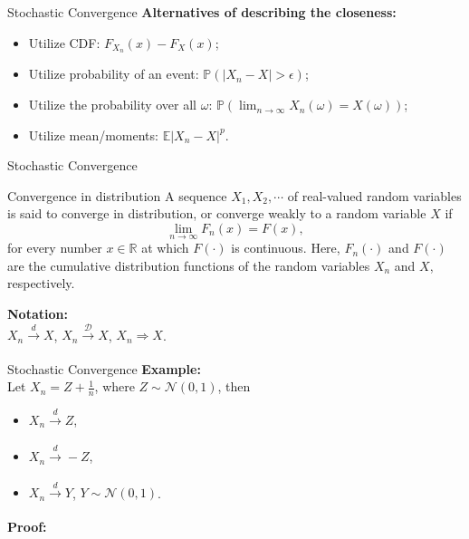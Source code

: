 \documentclass [aspectratio=169]{beamer}
\begin{document}
\begin{frame}{Stochastic Convergence}
    \textbf{Alternatives of describing the closeness:}
    \begin{itemize}
        \item Utilize CDF: $F_{X_n}(x) - F_X(x)$;
        \item Utilize probability of an event: $\mathbb{P}(|X_n - X| > \epsilon)$;
        \item Utilize the probability over all $\omega$: $\mathbb{P}(\lim _{n\to \infty }X_{n}(\omega )=X(\omega))$;
        \item Utilize mean/moments: $\mathbb{E}|X_n - X|^p$.
    \end{itemize}
\end{frame}



\begin{frame}{Stochastic Convergence}
    \begin{block}{Convergence in distribution}
    A sequence $X_1, X_2, \cdots$ of real-valued random variables is said to converge in distribution, or converge weakly to a random variable $X$ if
$$
{\displaystyle \lim _{n\to \infty }F_{n}(x)=F(x),}
$$
for every number $x \in \mathbb{R}$ at which $F(\cdot)$ is continuous. Here, $F_n(\cdot)$ and $F(\cdot)$ are the cumulative distribution functions of the random variables $X_n$ and $X$, respectively.
\end{block}
\vspace{0.1in}
\textbf{Notation:}\\
$X_n \xrightarrow[]{d} X$, \quad $X_n \xrightarrow[]{\mathcal{D}} X$, \quad $X_n \Rightarrow X$. \\
\vspace{0.1in}
\end{frame}




\begin{frame}{Stochastic Convergence}
    \textbf{Example:}\\
    Let $X_n = Z + \frac{1}{n}$, where $Z \sim \mathcal{N}(0,1)$, then 
    \begin{itemize}
        \item $X_n \xrightarrow[]{d} Z$,
        \item $X_n \xrightarrow[]{d} -Z$,
        \item $X_n \xrightarrow[]{d} Y$, $Y \sim \mathcal{N}(0,1)$.
    \end{itemize}
    \vspace{0.1in}
    \textbf{Proof:}\\
    \vspace{1in}
\end{frame}
\end{document}
